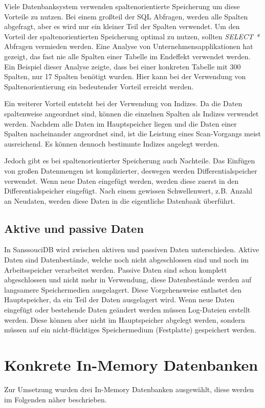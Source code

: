 \documentclass[draft,final]{vutinfth} %
\begin{document}
Viele Datenbanksystem verwenden spaltenorientierte Speicherung um diese Vorteile zu nutzen. Bei einem gro{\ss}teil der SQL Abfragen, werden alle Spalten abgefragt, aber es wird nur ein kleiner Teil der Spalten verwendet. Um den Vorteil der spaltenorientierten Speicherung optimal zu nutzen, sollten \textit{SELECT *} Abfragen vermieden werden. Eine Analyse von Unternehmensapplikationen hat gezeigt, das fast nie alle Spalten einer Tabelle im Endeffekt verwendet werden. Ein Beispiel dieser Analyse zeigte, dass bei einer konkreten Tabelle mit 300 Spalten, nur 17 Spalten benötigt wurden. Hier kann bei der Verwendung von Spaltenorientierung ein bedeutender Vorteil erreicht werden.

Ein weiterer Vorteil entsteht bei der Verwendung von Indizes. Da die Daten spaltenweise angeordnet sind, können die einzelnen Spalten als Indizes verwendet werden. Nachdem alle Daten im Hauptspeicher liegen und die Daten einer Spalten nacheinander angeordnet sind, ist die Leistung eines Scan-Vorgangs meist ausreichend. Es können dennoch bestimmte Indizes angelegt werden.

Jedoch gibt es bei spaltenorientierter Speicherung auch Nachteile. Das Einfügen von gro\ss en Datenmengen ist komplizierter, deswegen werden Differentialspeicher verwendet. Wenn neue Daten eingefügt werden, werden diese zuerst in den Differentialspeicher eingefügt. Nach einem gewissen Schwellenwert, z.B. Anzahl an Neudaten, werden diese Daten in die eigentliche Datenbank überführt.


\subsection{Aktive und passive Daten}
In SanssouciDB wird zwischen aktiven und passiven Daten unterschieden. Aktive Daten sind Datenbestände, welche noch nicht abgeschlossen sind und noch im Arbeitsspeicher verarbeitet werden. Passive Daten sind schon komplett abgeschlossen und nicht mehr in Verwendung, diese Datenbestände werden auf langsamere Speichermedien ausgelagert. Diese Vorgehensweise entlastet den Hauptspeicher, da ein Teil der Daten ausgelagert wird. Wenn neue Daten eingefügt oder bestehende Daten geändert werden müssen Log-Dateien erstellt werden. Diese können aber nicht im Hauptspeicher abgelegt werden, sondern müssen auf ein nicht-flüchtiges Speichermedium (Festplatte) gespeichert werden.


\section{Konkrete In-Memory Datenbanken}
Zur Umsetzung wurden drei In-Memory Datenbanken ausgewählt, diese werden im Folgenden näher beschrieben.
\end{document}
